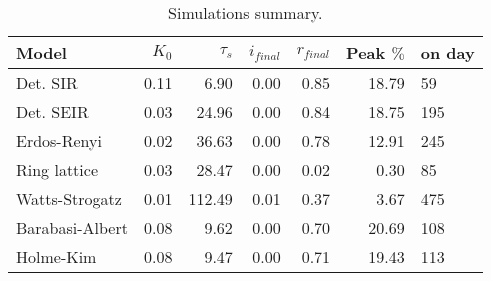 \begin{table}
\centering
\caption{Simulations summary.}
\label{tab:results}
\begin{tabular}{lrrrrrl}
\toprule
           Model & $K_{0}$ & $\tau_{s}$ & $i_{final}$ & $r_{final}$ & Peak $\%$ & on day \\
\midrule
        Det. SIR &    0.11 &      6.90 &        0.00 &        0.85 &     18.79 &     59 \\
       Det. SEIR &    0.03 &     24.96 &        0.00 &        0.84 &     18.75 &    195 \\
     Erdos-Renyi &    0.02 &     36.63 &        0.00 &        0.78 &     12.91 &    245 \\
    Ring lattice &    0.03 &     28.47 &        0.00 &        0.02 &      0.30 &     85 \\
  Watts-Strogatz &    0.01 &    112.49 &        0.01 &        0.37 &      3.67 &    475 \\
 Barabasi-Albert &    0.08 &      9.62 &        0.00 &        0.70 &     20.69 &    108 \\
       Holme-Kim &    0.08 &      9.47 &        0.00 &        0.71 &     19.43 &    113 \\
\bottomrule
\end{tabular}
\end{table}
